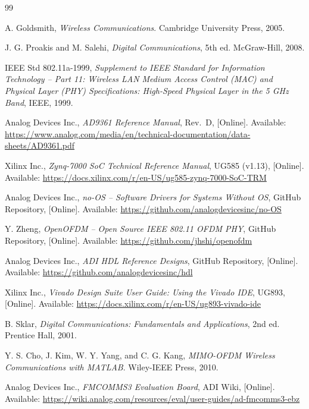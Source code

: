 \documentclass[12pt, a4paper, oneside]{report}
\begin{document}
\begin{thebibliography}{99}

A. Goldsmith,
\textit{Wireless Communications}.
Cambridge University Press, 2005.

J. G. Proakis and M. Salehi,
\textit{Digital Communications}, 5th ed.
McGraw-Hill, 2008.

IEEE Std 802.11a-1999,
\textit{Supplement to IEEE Standard for Information Technology -- Part 11: Wireless LAN Medium Access Control (MAC) and Physical Layer (PHY) Specifications: High-Speed Physical Layer in the 5 GHz Band},
IEEE, 1999.

Analog Devices Inc.,
\textit{AD9361 Reference Manual}, Rev.\ D,
[Online]. Available: \url{https://www.analog.com/media/en/technical-documentation/data-sheets/AD9361.pdf}

Xilinx Inc.,
\textit{Zynq-7000 SoC Technical Reference Manual}, UG585 (v1.13),
[Online]. Available: \url{https://docs.xilinx.com/r/en-US/ug585-zynq-7000-SoC-TRM}

Analog Devices Inc.,
\textit{no-OS -- Software Drivers for Systems Without OS},
GitHub Repository,
[Online]. Available: \url{https://github.com/analogdevicesinc/no-OS}

Y. Zheng,
\textit{OpenOFDM -- Open Source IEEE 802.11 OFDM PHY},
GitHub Repository,
[Online]. Available: \url{https://github.com/jhshi/openofdm}

Analog Devices Inc.,
\textit{ADI HDL Reference Designs},
GitHub Repository,
[Online]. Available: \url{https://github.com/analogdevicesinc/hdl}

Xilinx Inc.,
\textit{Vivado Design Suite User Guide: Using the Vivado IDE}, UG893,
[Online]. Available: \url{https://docs.xilinx.com/r/en-US/ug893-vivado-ide}

B. Sklar,
\textit{Digital Communications: Fundamentals and Applications}, 2nd ed.
Prentice Hall, 2001.

Y. S. Cho, J. Kim, W. Y. Yang, and C. G. Kang,
\textit{MIMO-OFDM Wireless Communications with MATLAB}.
Wiley-IEEE Press, 2010.

Analog Devices Inc.,
\textit{FMCOMMS3 Evaluation Board},
ADI Wiki,
[Online]. Available: \url{https://wiki.analog.com/resources/eval/user-guides/ad-fmcomms3-ebz}

\end{thebibliography}
\end{document}
